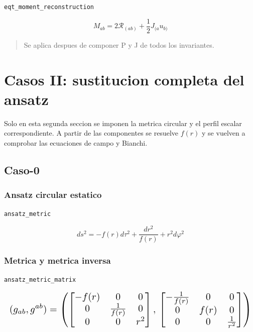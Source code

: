 \documentclass[11pt,a4paper]{article}
\begin{document}
\noindent\texttt{eqt\_moment\_reconstruction}\par\nopagebreak[4]

\[
M_{ab} = 2\mathcal R_{(ab)}+\frac12J_{(a}u_{b)}
\]

\begin{quote}\small Se aplica despues de componer P y J de todos los invariantes.\end{quote}

\section{Casos II: sustitucion completa del ansatz}

Solo en esta segunda seccion se imponen la metrica circular y el perfil escalar correspondiente. A partir de las componentes se resuelve $f(r)$ y se vuelven a comprobar las ecuaciones de campo y Bianchi.

\subsection{Caso-0}

\subsubsection{Ansatz circular estatico}

\noindent\texttt{ansatz\_metric}\par\nopagebreak[4]

\[
ds^2 = -f(r)d\tau^2+\frac{dr^2}{f(r)}+r^2d\varphi^2
\]

\subsubsection{Metrica y metrica inversa}

\noindent\texttt{ansatz\_metric\_matrix}\par\nopagebreak[4]

\[
\resizebox{\textwidth}{!}{$\displaystyle (g_{ab},g^{ab}) = \left(\left[\begin{matrix}- f{\left(r \right)} & 0 & 0\\0 & \frac{1}{f{\left(r \right)}} & 0\\0 & 0 & r^{2}\end{matrix}\right],\,\left[\begin{matrix}- \frac{1}{f{\left(r \right)}} & 0 & 0\\0 & f{\left(r \right)} & 0\\0 & 0 & \frac{1}{r^{2}}\end{matrix}\right]\right)$}
\]
\end{document}
